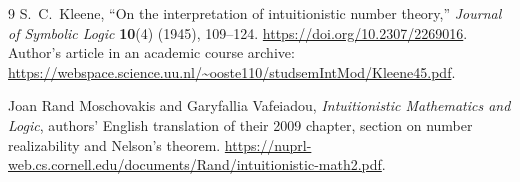 \begin{thebibliography}{9}
S.~C.~Kleene, ``On the interpretation of intuitionistic number theory,''
\emph{Journal of Symbolic Logic} \textbf{10}(4) (1945), 109--124.
\url{https://doi.org/10.2307/2269016}.
Author's article in an academic course archive:
\url{https://webspace.science.uu.nl/~ooste110/studsemIntMod/Kleene45.pdf}.

Joan Rand Moschovakis and Garyfallia Vafeiadou, \emph{Intuitionistic
Mathematics and Logic}, authors' English translation of their 2009
chapter, section on number realizability and Nelson's theorem.
\url{https://nuprl-web.cs.cornell.edu/documents/Rand/intuitionistic-math2.pdf}.
\end{thebibliography}
